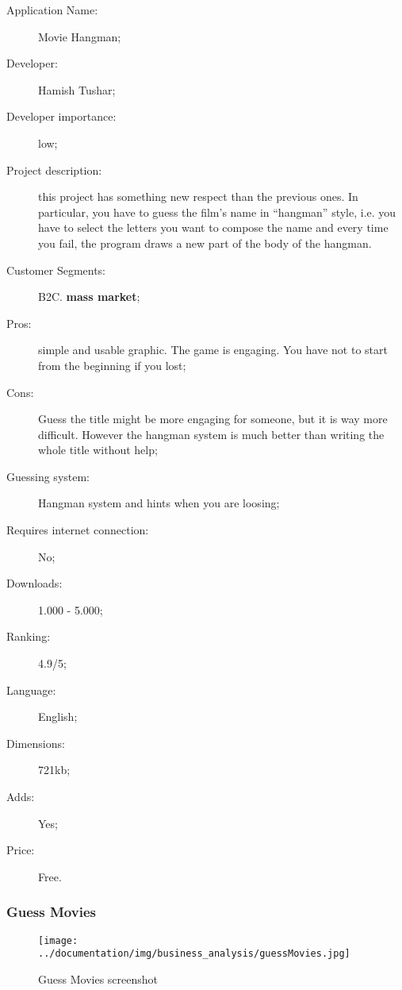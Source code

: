 \begin{description}
\item[Application Name:] Movie Hangman;
\item[Developer:] Hamish Tushar;
\item[Developer importance:] low;
\item[Project description:] this project has something new respect than the previous ones. In particular, you have to guess the film's name in ``hangman'' style, i.e. you have to select the letters you want to compose the name and every time you fail, the program draws a new part of the body of the hangman.
\item[Customer Segments:] B2C. \textbf{mass market};
\item[Pros:] simple and usable graphic. The game is engaging. You have not to start from the beginning if you lost;
\item[Cons:] Guess the title might be more engaging for someone, but it is way more difficult. However the hangman system is much better than writing the whole title without help;
\item[Guessing system:] Hangman system and hints when you are loosing;
\item[Requires internet connection:] No;
\item[Downloads:] 1.000 - 5.000;
\item[Ranking:] 4.9/5;
\item[Language:] English;
\item[Dimensions:] 721kb;
\item[Adds:] Yes;
\item[Price:] Free.
\end{description}

\subsubsection{Guess Movies}

\begin{figure}[H]
\centering %
\texttt{[image: ../documentation/img/business\_analysis/guessMovies.jpg]}
\caption{Guess Movies screenshot}
\label{fig:guessMovies}
\end{figure}

